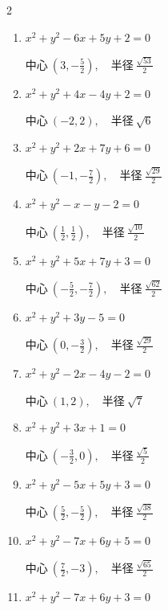 \begin{multicols}{2}
\begin{enumerate}
  \item $x^{2}+y^{2}-6x+5y+2=0$

        $\displaystyle 中心\: \left(3,-\frac{5}{2}\right), \quad 半径 \ \frac{\sqrt{53}}{2}$

  \item $x^{2}+y^{2}+4x-4y+2=0$

        $\displaystyle 中心\: \left(-2,2\right), \quad 半径 \ \sqrt{6}$

  \item $x^{2}+y^{2}+2x+7y+6=0$

        $\displaystyle 中心\: \left(-1,-\frac{7}{2}\right), \quad 半径 \ \frac{\sqrt{29}}{2}$

  \item $x^{2}+y^{2}-x-y-2=0$

        $\displaystyle 中心\: \left(\frac{1}{2},\frac{1}{2}\right), \quad 半径 \ \frac{\sqrt{10}}{2}$

  \item $x^{2}+y^{2}+5x+7y+3=0$

        $\displaystyle 中心\: \left(-\frac{5}{2},-\frac{7}{2}\right), \quad 半径 \ \frac{\sqrt{62}}{2}$

  \item $x^{2}+y^{2}+3y-5=0$

        $\displaystyle 中心\: \left(0,-\frac{3}{2}\right), \quad 半径 \ \frac{\sqrt{29}}{2}$

\columnbreak %

  \item $x^{2}+y^{2}-2x-4y-2=0$

        $\displaystyle 中心\: \left(1,2\right), \quad 半径 \ \sqrt{7}$

  \item $x^{2}+y^{2}+3x+1=0$

        $\displaystyle 中心\: \left(-\frac{3}{2},0\right), \quad 半径 \ \frac{\sqrt{5}}{2}$

  \item $x^{2}+y^{2}-5x+5y+3=0$

        $\displaystyle 中心\: \left(\frac{5}{2},-\frac{5}{2}\right), \quad 半径 \ \frac{\sqrt{38}}{2}$

  \item $x^{2}+y^{2}-7x+6y+5=0$

        $\displaystyle 中心\: \left(\frac{7}{2},-3\right), \quad 半径 \ \frac{\sqrt{65}}{2}$

  \item $x^{2}+y^{2}-7x+6y+3=0$


\end{enumerate}
\end{multicols}
